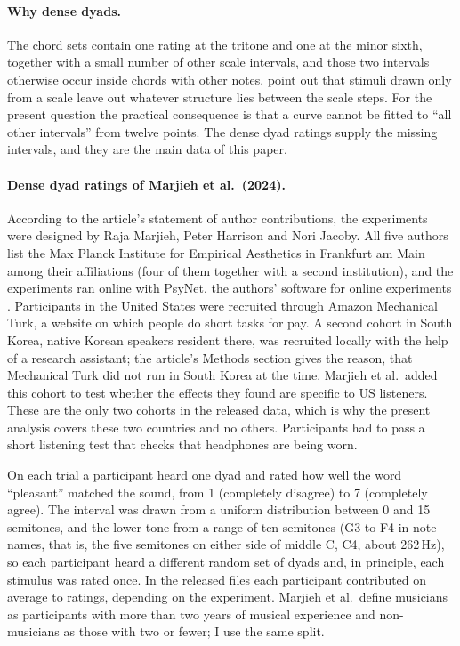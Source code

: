 \documentclass[11pt,a4paper]{article}
\begin{document}
\paragraph{Why dense dyads.}
The chord sets contain one rating at the tritone and one at the minor sixth, together with a
small number of other scale intervals, and those two intervals otherwise occur inside chords
with other notes. \citet{marjieh2024} point out that stimuli drawn only from a scale leave
out whatever structure lies between the scale steps. For the present question the practical
consequence is that a curve cannot be fitted to ``all other intervals'' from twelve points.
The dense dyad ratings supply the missing intervals, and they are the main data of this paper.

\paragraph{Dense dyad ratings of Marjieh et al.\ (2024).}
According to the article's statement of author contributions, the experiments were
designed by Raja Marjieh, Peter Harrison and Nori Jacoby. All five authors list the Max
Planck Institute for Empirical Aesthetics in Frankfurt am Main among their affiliations
(four of them together with a second institution), and the experiments ran online with
PsyNet, the authors' software for online experiments \citep{marjieh2024}. Participants in the United States were
recruited through Amazon Mechanical Turk, a website on which people do short tasks for pay. A second cohort in South Korea, native
Korean speakers resident there, was recruited locally with the help of a research assistant; the
article's Methods section gives the reason, that Mechanical Turk did not run in South Korea
at the time. Marjieh et al.\ added this cohort to test whether the effects they found are
specific to US listeners. These are the only two cohorts
in the released data, which is why the present analysis covers these two countries and no
others. Participants had to pass a short listening test that checks that headphones are being worn.

On each trial a participant heard one dyad and rated how well the word ``pleasant'' matched
the sound, from 1 (completely disagree) to 7 (completely agree). The interval was drawn from
a uniform distribution between 0 and 15 semitones, and the lower tone from a range of ten
semitones (G3 to F4 in note names, that is, the five semitones on either side of middle C,
C4, about 262\,Hz), so each participant heard a different random set of dyads and, in
principle, each stimulus was rated once. In the released files each participant contributed
on average \nTrialsPerPartMin{} to \nTrialsPerPartMax{} ratings, depending on the experiment.
Marjieh et al.\ define musicians as participants with more than two years of musical
experience and non-musicians as those with two or fewer; I use the same split.
\end{document}
